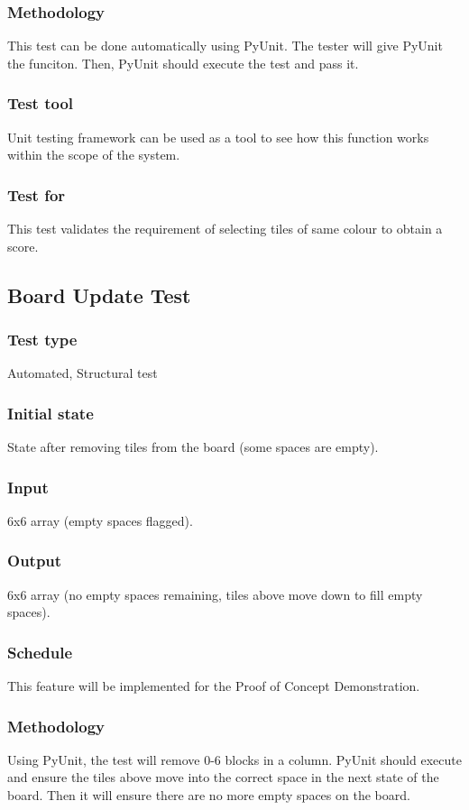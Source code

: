 \documentclass[12pt]{article}
\begin{document}
\subsubsection{Methodology}
This test can be done automatically using PyUnit. The tester will give PyUnit the funciton. Then, PyUnit should execute the test and pass it.
\subsubsection{Test tool}
Unit testing framework can be used as a tool to see how this function works within the scope of the system. 
\subsubsection{Test for}
This test validates the requirement of selecting tiles of same colour to obtain a score.

\newpage

\subsection{Board Update Test}
\subsubsection{Test type}
Automated, Structural test
\subsubsection{Initial state}
State after removing tiles from the board (some spaces are empty).
\subsubsection{Input}
6x6 array (empty spaces ﬂagged).
\subsubsection{Output}
6x6 array (no empty spaces remaining, tiles above move down to ﬁll empty spaces).
\subsubsection{Schedule}
This feature will be implemented for the Proof of Concept Demonstration.
\subsubsection{Methodology}
Using PyUnit, the test will remove 0-6 blocks in a column. PyUnit should execute and ensure the tiles above move into the correct space in the next state of the board. Then it will ensure there are no more empty spaces on the board. 
\end{document}
